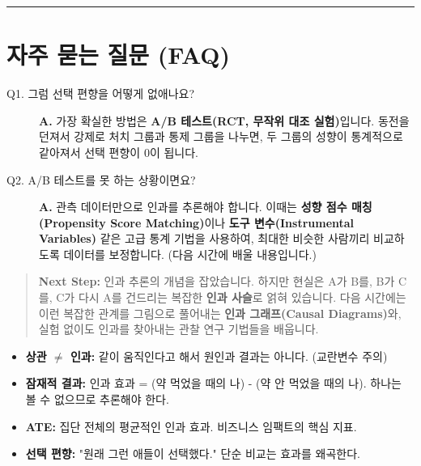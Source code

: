 \documentclass[11pt,a4paper]{book}
\theoremstyle{definition}
\begin{document}
\vspace{0.5cm}\hrule\vspace{0.5cm}

\section{자주 묻는 질문 (FAQ)}

\begin{description}
    \item[Q1. 그럼 선택 편향을 어떻게 없애나요?]
    \textbf{A.} 가장 확실한 방법은 \textbf{A/B 테스트(RCT, 무작위 대조 실험)}입니다. 동전을 던져서 강제로 처치 그룹과 통제 그룹을 나누면, 두 그룹의 성향이 통계적으로 같아져서 선택 편향이 0이 됩니다.
    
    \item[Q2. A/B 테스트를 못 하는 상황이면요?]
    \textbf{A.} 관측 데이터만으로 인과를 추론해야 합니다. 이때는 \textbf{성향 점수 매칭(Propensity Score Matching)}이나 \textbf{도구 변수(Instrumental Variables)} 같은 고급 통계 기법을 사용하여, 최대한 비슷한 사람끼리 비교하도록 데이터를 보정합니다. (다음 시간에 배울 내용입니다.)
\end{description}

\vspace{1cm}
\begin{quote}
\textbf{Next Step:} 인과 추론의 개념을 잡았습니다. 하지만 현실은 A가 B를, B가 C를, C가 다시 A를 건드리는 복잡한 \textbf{인과 사슬}로 얽혀 있습니다. 다음 시간에는 이런 복잡한 관계를 그림으로 풀어내는 \textbf{인과 그래프(Causal Diagrams)}와, 실험 없이도 인과를 찾아내는 관찰 연구 기법들을 배웁니다.
\end{quote}

\begin{summarybox}[title={Module 4 핵심 요약}]
\begin{itemize}
    \item \textbf{상관 $\neq$ 인과:} 같이 움직인다고 해서 원인과 결과는 아니다. (교란변수 주의)
    \item \textbf{잠재적 결과:} 인과 효과 = (약 먹었을 때의 나) - (약 안 먹었을 때의 나). 하나는 볼 수 없으므로 추론해야 한다.
    \item \textbf{ATE:} 집단 전체의 평균적인 인과 효과. 비즈니스 임팩트의 핵심 지표.
    \item \textbf{선택 편향:} "원래 그런 애들이 선택했다." 단순 비교는 효과를 왜곡한다.
\end{itemize}
\end{summarybox}
\end{document}
